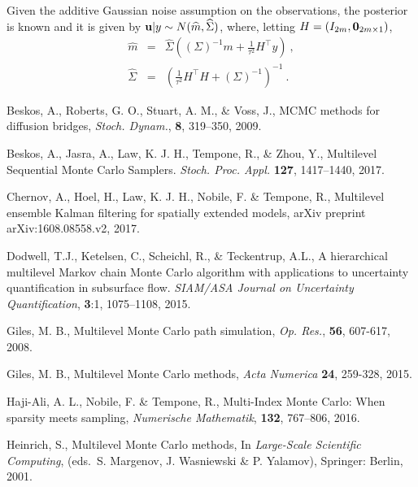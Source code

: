 \documentclass[english]{article}
\begin{document}
Given the additive Gaussian noise assumption on the observations,
the posterior is known %
and it is given by 
${\bf u}|y \sim N(\widehat{m}, \widehat{\Sigma})$,
where, letting $H=(I_{2m},{\bf 0}_{2m \times 1})$,  
  \begin{eqnarray}\label{eq:posteriorX}
\widehat{m} &=& 
\widehat\Sigma \left ( \left (\Sigma\right )^{-1} m + \frac{1}{\tau^2}H^\top y\right) \ , \\
\widehat{\Sigma} &=& \left (\frac{1}{\tau^2} H^\top H 
+ \left (\Sigma\right )^{-1} \right )^{-1} \ .
\end{eqnarray}







\begin{thebibliography}{9}

{ Beskos}, A., { Roberts}, G. O., { Stuart}, A. M., \&{ Voss}, J., 
MCMC methods for diffusion bridges,  
\emph{Stoch. Dynam.}, {\bf 8}, 319--350, 2009. 

{ Beskos}, A., 
{ Jasra}, A., 
{ Law}, K. J. H., 
{ Tempone}, R., \& 
{ Zhou}, Y.,  
Multilevel Sequential Monte Carlo Samplers. {\em Stoch. Proc. Appl.} {\bf 127}, 1417--1440, 2017.

{ Chernov}, A., { Hoel}, H., { Law}, K. J. H.,{  Nobile}, F. \& { Tempone}, R., 
{Multilevel ensemble Kalman filtering for spatially extended models, }
arXiv preprint arXiv:1608.08558.v2, 2017.


{ Dodwell, T.J., Ketelsen, C., Scheichl, R., \& Teckentrup, A.L.}, 
{A hierarchical multilevel Markov chain Monte Carlo algorithm with applications to uncertainty quantification in subsurface flow}.  
\emph{SIAM/ASA Journal on Uncertainty Quantification}, 
{\bf 3}:{1}, {1075--1108}, 2015.

{ Giles}, M. B.,  
Multilevel Monte Carlo path simulation, 
\emph{Op. Res.}, {\bf 56}, 607-617, 2008.

{ Giles}, M. B.,  Multilevel Monte Carlo methods, 
\emph{Acta Numerica} {\bf 24}, 259-328, 2015.

{ Haji-Ali,} A. L., { Nobile}, F.  \& { Tempone}, R., 
Multi-Index Monte Carlo: When sparsity meets sampling, 
\emph{Numerische Mathematik}, {\bf 132}, 767--806, 2016.


{ Heinrich}, S., 
{Multilevel {Mo}nte {C}arlo methods}, 
In \emph{Large-Scale Scientific Computing}, (eds.~S. Margenov, J. Wasniewski \&
P. Yalamov), Springer: Berlin, 2001.


\end{thebibliography}
\end{document}
